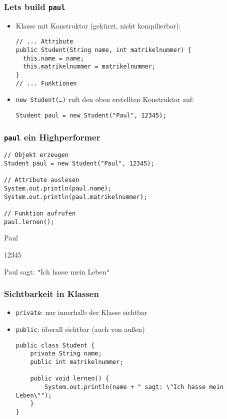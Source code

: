 \documentclass{../../presentation}
\begin{document}
\begin{frame}[fragile]
	\frametitle{Let\textquotesingle s build \texttt{paul}}
	\begin{itemize}
		\item Klasse mit Konstruktor (gekürzt, nicht kompilierbar):
		      \begin{verbatim}
// ... Attribute 
public Student(String name, int matrikelnummer) {
  this.name = name;
  this.matrikelnummer = matrikelnummer;
}
// ... Funktionen
			  \end{verbatim}
		\item<2->\texttt{new Student(\dots)} ruft den oben erstellten Konstruktor auf:
		      \begin{verbatim}
Student paul = new Student("Paul", 12345);
			  \end{verbatim}
	\end{itemize}
\end{frame}


\begin{frame}[fragile]
	\frametitle{\texttt{paul} ein Highperformer}
	\begin{verbatim}
// Objekt erzeugen
Student paul = new Student("Paul", 12345);

// Attribute auslesen
System.out.println(paul.name);
System.out.println(paul.matrikelnummer);

// Funktion aufrufen
paul.lernen();
\end{verbatim}

	\begin{ausgabe}
		Paul

		12345

		Paul sagt: \texttt{"}Ich hasse mein Leben\texttt{"}
	\end{ausgabe}
\end{frame}



\begin{frame}[fragile]
	\frametitle{Sichtbarkeit in Klassen}
	\pause
	\begin{itemize}
		\item \texttt{private}: nur innerhalb der Klasse sichtbar
		      \pause
		\item \texttt{public}: überall sichtbar (auch von außen)
		      \pause
		      \begin{verbatim}
public class Student {
    private String name;         
    public int matrikelnummer;   

    public void lernen() {
        System.out.println(name + " sagt: \"Ich hasse mein Leben\"");
    }
}
	\end{verbatim}
	\end{itemize}
\end{frame}
\end{document}
